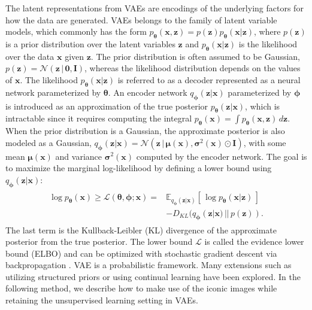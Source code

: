The latent representations from VAEs are encodings of the underlying factors for how the data are generated. VAEs belongs to the family of latent variable models, which commonly has the form $p_{\boldsymbol{\theta}}(\mathbf{x},\mathbf{z}) = p(\mathbf{z}) p_{\boldsymbol{\theta}}(\mathbf{x}|\mathbf{z})$, where $p(\mathbf{z})$ is a prior distribution over the latent variables $\mathbf{z}$ and $p_{\boldsymbol{\theta}}(\mathbf{x}|\mathbf{z})$ is the likelihood over the data $\mathbf{x}$ given $\mathbf{z}$. The prior distribution is often assumed to be Gaussian,
$p(\mathbf{z}) = \mathcal{N}(\mathbf{z}\,|\, \boldsymbol{0}, \mathbf{I})$,  
whereas the likelihood distribution depends on the values of $\mathbf{x}$.
The likelihood $p_{\boldsymbol{\theta}}(\mathbf{x}|\mathbf{z})$ is referred to as a decoder represented as a neural network parameterized by $\boldsymbol{\theta}$. An encoder network $q_{\boldsymbol{\phi}}(\mathbf{z}|\mathbf{x})$ parameterized by $\boldsymbol{\phi}$ is introduced as an approximation of the true posterior $p_{\boldsymbol{\theta}}(\mathbf{z}|\mathbf{x})$, which is intractable since it requires computing the integral $p_{\boldsymbol{\theta}}(\mathbf{x}) = \int p_{\boldsymbol{\theta}}(\mathbf{x}, \mathbf{z}) \, d\mathbf{z}$. 
When the prior distribution is a Gaussian, the approximate posterior is also modeled as a Gaussian, $q_{\boldsymbol{\phi}}(\mathbf{z}|\mathbf{x}) = \mathcal{N}(\mathbf{z} \,|\,\boldsymbol{\mu}(\mathbf{x}), \boldsymbol{\sigma}^2(\mathbf{x}) \odot \mathbf{I})$, with some mean $\boldsymbol{\mu}(\mathbf{x})$ and variance $\boldsymbol{\sigma}^2(\mathbf{x})$ computed by the encoder network. The goal is to maximize the marginal log-likelihood by defining a lower bound using $q_{\boldsymbol{\phi}}(\mathbf{z}|\mathbf{x})$:
\begin{align}
\begin{split}\label{eq:vae-loss}
\log p_{\boldsymbol{\theta}}(\mathbf{x}) \geq \mathcal{L}(\boldsymbol{\theta}, \boldsymbol{\phi}; \mathbf{x}) = & \mathbb{E}_{q_{\boldsymbol{\phi}}(\mathbf{z}|\mathbf{x})}\left[\, \log p_{\boldsymbol{\theta}}(\mathbf{x} | \mathbf{z}) \,\right] \\ & -D_{KL}(q_{\boldsymbol{\phi}}(\mathbf{z}|\mathbf{x})\,||\,p(\mathbf{z})) .
\end{split}
\end{align}
The last term is the Kullback-Leibler (KL) divergence of the approximate posterior from the true posterior. The lower bound $\mathcal{L}$ is called the evidence lower bound (ELBO) and can be optimized with stochastic gradient descent via backpropagation \cite{doersch2016tutorialvae,kingma2014autoencoding}. 
VAE is a probabilistic framework. Many extensions such as utilizing structured priors\cite{butepage2018Inform} or using continual learning \cite{nguyen2018variational} have been explored.
In the following method, we describe how to make use of the iconic images while retaining the unsupervised learning setting in VAEs.

